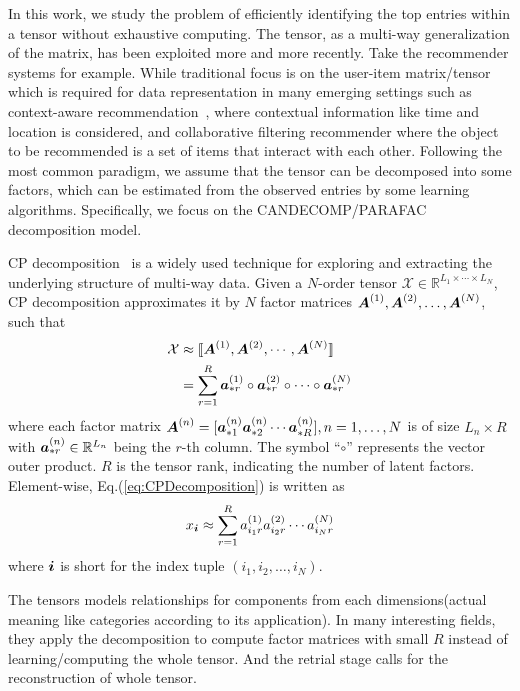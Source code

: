 \documentclass[10pt,journal,compsoc]{IEEEtran}
\newcommand{\Sca}[3]{{#1}^{(#2)}_{i_#2#3}}%
\newcommand{\anr}[2]{\Sca{a}{#1}{#2}}
\newcommand{\T}[1]{\mathcal{#1}}
\newcommand{\KT}[1]{\llbracket #1 \rrbracket}
\newcommand{\V}[1]{{\boldsymbol{{\MakeLowercase{#1}}}}}
\newcommand{\ColVec}[3]{\V{#1}^{(#2)}_{#3}}
\newcommand{\ColVecA}[1]{\V{a}^{(#1)}_{*r}}
\newcommand{\M}[1]{{\boldsymbol{{\MakeUppercase{#1}}}}}
\newcommand{\FacMat}[2]{\M{#1}^{(#2)}}
\newcommand{\Eqn}[1]{Eq.(\ref{eq:#1})}
\begin{document}
In this work, we study the problem of efficiently identifying the top entries within a tensor without exhaustive computing. The tensor, as a multi-way generalization of the matrix, has been exploited more and more recently.
Take the recommender systems for example.
While traditional focus is on the user-item matrix/tensor
which is required for data representation in many emerging settings
such as context-aware recommendation~\cite{?},
where contextual information like time and location is considered,
and collaborative filtering recommender\cite{HuYiLa15,Rendle_PITF,KoYe09}
where the object to be recommended is a set of items that interact with each other.
Following the most common paradigm, we assume that the tensor can be decomposed into some factors,
which can be estimated from the observed entries by some learning algorithms.
Specifically, we focus on the CANDECOMP/PARAFAC decomposition model.

CP decomposition~\cite{KoBa09} is a widely used technique for exploring and
extracting the underlying structure of multi-way data.
Given a $N$-order tensor $\T{X}\in\mathbb{R}^{L_1\times \cdots\times L_N}$,
CP decomposition approximates it by $N$ factor matrices $\FacMat{A}{1},\FacMat{A}{2},\ldots,\FacMat{A}{N}$,
such that
\begin{align}
\label{eq:CPDecomposition}
\T{X}&\approx\KT{\FacMat{A}{1},\FacMat{A}{2},\cdots,\FacMat{A}{N}} \\ \notag
&=\sum_{r=1}^R\ColVecA{1}\circ\ColVecA{2}\circ\cdots\circ\ColVecA{N}
\end{align}
where each factor matrix
$\FacMat{A}{n}=[\ColVec{a}{n}{*1}\ColVec{a}{n}{*2}\cdots\ColVec{a}{n}{*R}], n=1,\ldots,N$
is of size $L_n\times R$ with $\ColVec{a}{n}{*r}\in\mathbb{R}^{L_n}$
being the $r$-th column.
The symbol ``$\circ$'' represents the vector outer product.
$R$ is the tensor rank, indicating the number of latent factors.
Element-wise, \Eqn{CPDecomposition} is written as
\begin{align}
\label{eq:CPValue}
x_\V{i} \approx \sum_{r=1}^{R}\anr{1}{r}\anr{2}{r}\cdots\anr{N}{r}
\end{align}
where $\V{i}$ is short for the index tuple $(i_1,i_2,\ldots,i_N)$.

The tensors models relationships for components from each dimensions(actual meaning like categories according to its application). In many interesting fields, they apply the decomposition to compute factor matrices with small $R$ instead of learning/computing the whole tensor. And the retrial stage calls for the reconstruction of whole tensor.
\end{document}
